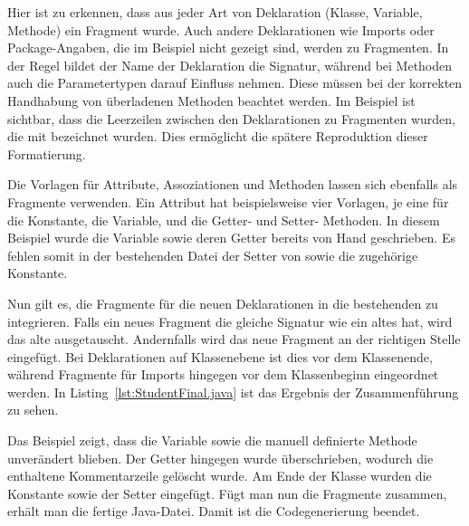 
Hier ist zu erkennen, dass aus jeder Art von Deklaration (Klasse, Variable, Methode) ein Fragment wurde.
Auch andere Deklarationen wie Imports oder Package-Angaben, die im Beispiel nicht gezeigt sind, werden zu Fragmenten.
In der Regel bildet der Name der Deklaration die Signatur, während bei Methoden auch die Parametertypen darauf Einfluss nehmen.
Diese müssen bei der korrekten Handhabung von überladenen Methoden beachtet werden.
Im Beispiel ist sichtbar, dass die Leerzeilen zwischen den Deklarationen zu Fragmenten wurden, die mit  bezeichnet wurden.
Dies ermöglicht die spätere Reproduktion dieser Formatierung.

Die Vorlagen für Attribute, Assoziationen und Methoden lassen sich ebenfalls als Fragmente verwenden.
Ein Attribut hat beispielsweise vier Vorlagen, je eine für die Konstante, die Variable, und die Getter- und Setter- Methoden.
In diesem Beispiel wurde die Variable  sowie deren Getter bereits von Hand geschrieben.
Es fehlen somit in der bestehenden Datei der Setter von  sowie die zugehörige Konstante.

Nun gilt es, die Fragmente für die neuen Deklarationen in die bestehenden zu integrieren.
Falls ein neues Fragment die gleiche Signatur wie ein altes hat, wird das alte ausgetauscht.
Andernfalls wird das neue Fragment an der richtigen Stelle eingefügt.
Bei Deklarationen auf Klassenebene ist dies vor dem Klassenende, während Fragmente für Imports hingegen vor dem Klassenbeginn eingeordnet werden.
In Listing~\ref{lst:StudentFinal.java} ist das Ergebnis der Zusammenführung zu sehen.


Das Beispiel zeigt, dass die Variable sowie die manuell definierte Methode unverändert blieben.
Der Getter hingegen wurde überschrieben, wodurch die enthaltene Kommentarzeile gelöscht wurde.
Am Ende der Klasse wurden die Konstante sowie der Setter eingefügt.
Fügt man nun die Fragmente zusammen, erhält man die fertige Java-Datei.
Damit ist die Codegenerierung beendet.
